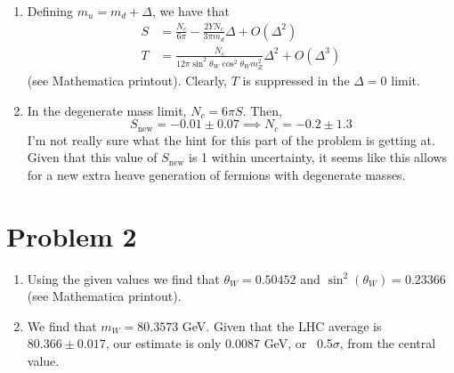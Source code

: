 \documentclass[12pt]{article}
\begin{document}
\begin{enumerate}[label=(\alph*)]
    \item Defining $m_u = m_d + \Delta$, we have that
    \begin{align*}
        S &= \frac{N_c}{6\pi} - \frac{2YN_c}{3\pi m_d}\Delta + O(\Delta^2) \\
        T &= \frac{N_c}{12\pi\sin^2\theta_W\cos^2\theta_Wm_Z^2}\Delta^2 + O(\Delta^3)
    \end{align*}
    (see Mathematica printout). Clearly, $T$ is suppressed in the $\Delta = 0$ limit.

    \item In the degenerate mass limit, $N_c = 6\pi S$. Then,
    \[ S_\text{new} = -0.01 \pm 0.07 \implies N_c = -0.2 \pm 1.3 \]
    I'm not really sure what the hint for this part of the problem is getting at. Given that this value of $S_\text{new}$ is 1 within uncertainty, it seems like this allows for a new extra heave generation of fermions with degenerate masses.
\end{enumerate}

\section{Problem 2}
\begin{enumerate}[label=(\alph*)]
    \item Using the given values we find that $\theta_W = 0.50452$ and $\sin^2(\theta_W) = 0.23366$ (see Mathematica printout).
    \item We find that $m_W = 80.3573$ GeV. Given that the LHC average is $80.366 \pm 0.017$, our estimate is only 0.0087 GeV, or ~0.5$\sigma$, from the central value.
\end{enumerate}
\end{document}
